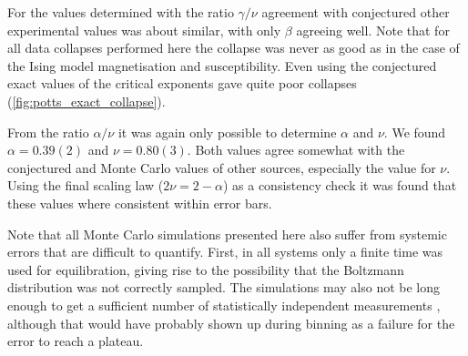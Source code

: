 \documentclass[11pt, a4paper]{report} %
\begin{document}
For the values determined with the ratio \(\gamma / \nu\) agreement with conjectured other experimental values was about similar, with only \(\beta\) agreeing well.
Note that for all data collapses performed here the collapse was never as good as in the case of the Ising model magnetisation and susceptibility.
Even using the conjectured exact values of the critical exponents gave quite poor collapses (\cref{fig:potts_exact_collapse}).

From the ratio \(\alpha/\nu\) it was again only possible to determine \(\alpha\) and \(\nu\).
We found \(\alpha = 0.39(2)\) and \(\nu = 0.80(3)\).
Both values agree somewhat with the conjectured and Monte Carlo values of other sources, especially the value for \(\nu\).
Using the final scaling law (\(2\nu = 2 -\alpha\)) as a consistency check it was found that these values where consistent within error bars.

\vspace*{\baselineskip}

Note that all Monte Carlo simulations presented here also suffer from systemic errors that are difficult to quantify.
First, in all systems only a finite time was used for equilibration, giving rise to the possibility that the Boltzmann distribution was not correctly sampled.
The simulations may also not be long enough to get a sufficient number of statistically independent measurements \cite{newman:1999}, although that would have probably shown up during binning as a failure for the error to reach a plateau.
\end{document}
